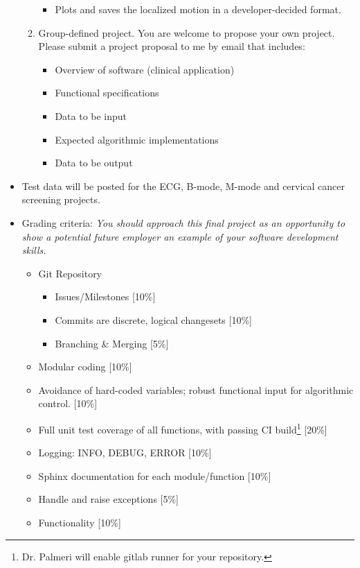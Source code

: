 \begin{itemize}
\begin{enumerate}
\begin{itemize}
            \item Plots and saves the localized motion in a developer-decided format.
        \end{itemize}
        \item Group-defined project.  You are welcome to propose your own project.  Please submit a project proposal to me by email that includes:
        \begin{itemize}
            \item Overview of software (clinical application)
            \item Functional specifications
            \item Data to be input
            \item Expected algorithmic implementations
            \item Data to be output
        \end{itemize}
    \end{enumerate}

    \item Test data will be posted for the ECG, B-mode, M-mode and cervical cancer screening projects.

\item Grading criteria:
\emph{You should approach this final project as an opportunity to show a potential future employer an example of your software development skills.}

\begin{itemize}
    \item Git Repository
        \begin{itemize}
            \item Issues/Milestones [10\%]
            \item Commits are discrete, logical changesets [10\%]
            \item Branching \& Merging [5\%]
        \end{itemize}
    \item Modular coding [10\%]
    \item Avoidance of hard-coded variables; robust functional input
        for algorithmic control. [10\%]
    \item Full unit test coverage of all functions, with passing CI
        build\footnote{Dr. Palmeri will enable gitlab runner for your
        repository.} [20\%]
    \item Logging: INFO, DEBUG, ERROR [10\%]
    \item Sphinx documentation for each module/function [10\%]
    \item Handle and raise exceptions [5\%]
    \item Functionality [10\%]
\end{itemize}

\end{itemize}




